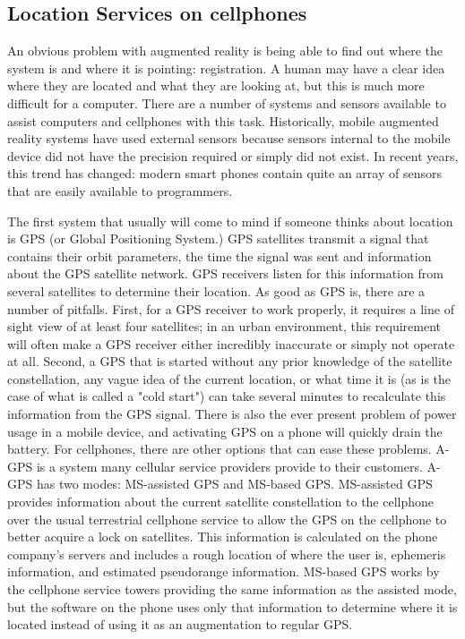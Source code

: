 \documentclass{acm_proc_article-sp}
\begin{document}
\subsection{Location Services on cellphones}

An obvious problem with augmented reality is being able to find out where the system is and where it is pointing: registration.  A human may have a clear idea where they are located and what they are looking at, but this is much more difficult for a computer. \cite{szeliski2010computer}  There are a number of systems and sensors available to assist computers and cellphones with this task.  
Historically, mobile augmented reality systems have used external sensors because sensors internal to the mobile device did not have the precision required or simply did not exist.  In recent years, this trend has changed:  modern smart phones contain quite an array of sensors that are easily available to programmers.  

The first system that usually will come to mind if someone thinks about location is GPS (or Global Positioning System.)  GPS satellites transmit a signal that contains their orbit parameters, the time the signal was sent and information about the GPS satellite network.  GPS receivers listen for this information from several satellites to determine their location. \cite{hofmann1997global}  As good as GPS is, there are a number of pitfalls.  First, for a GPS receiver to work properly, it requires a line of sight view of at least four satellites; in an urban environment, this requirement will often make a GPS receiver either incredibly inaccurate or simply not operate at all.  Second, a GPS that is started without any prior knowledge of the satellite constellation, any vague idea of the current location, or what time it is (as is the case of what is called a "cold start") can take several minutes to recalculate this information from the GPS signal.  There is also the ever present problem of power usage in a mobile device, and activating GPS on a phone will quickly drain the battery.  \cite{djuknic2002geolocation}  For cellphones, there are other options that can ease these problems.  A-GPS is a system many cellular service providers provide to their customers.  A-GPS has two modes: MS-assisted GPS and MS-based GPS. MS-assisted GPS provides information about the current  satellite constellation to the cellphone over the usual terrestrial cellphone service to allow the GPS on the cellphone to better acquire a lock on satellites.  This information is calculated on the phone company's servers and includes a rough location of where the user is, ephemeris information, and estimated pseudorange information. MS-based GPS works by the cellphone service towers providing the same information as the assisted mode, but the software on the phone uses only that information to determine where it is located instead of using it as an augmentation to regular GPS. \cite{sun2005signal}
\end{document}
